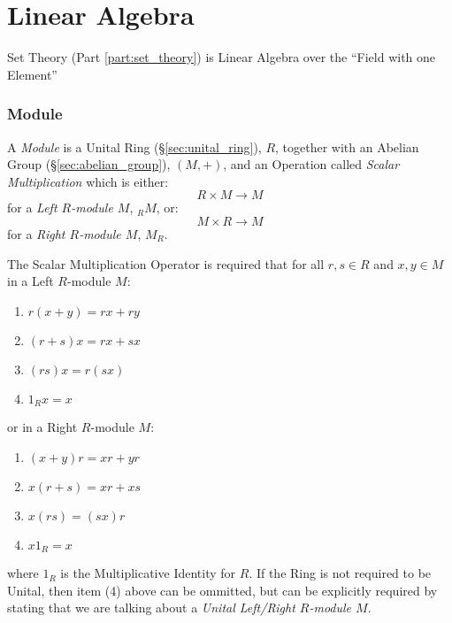 \part{Linear Algebra}\label{part:linear_algebra}

Set Theory (Part \ref{part:set_theory}) is Linear Algebra over the
``Field with one Element''



\section{Module}\label{sec:module}

A \emph{Module} is a Unital Ring (\S\ref{sec:unital_ring}), $R$,
together with an Abelian Group (\S\ref{sec:abelian_group}), $(M, +)$,
and an Operation called \emph{Scalar Multiplication} which is either:
\[ R \times M \rightarrow M \]
for a \emph{Left $R$-module $M$}, $_R M$, or:
\[ M \times R \rightarrow M \]
for a \emph{Right $R$-module $M$}, $M_R$.

The Scalar Multiplication Operator is required that for all $r,s \in
R$ and $x,y \in M$ in a Left $R$-module $M$:
\begin{enumerate}
    \item $r(x + y) = rx + ry$
    \item $(r + s)x = rx + sx$
    \item $(rs)x = r(sx)$
    \item $1_Rx = x$
\end{enumerate}
or in a Right $R$-module $M$:
\begin{enumerate}
    \item $(x + y)r = xr + yr$
    \item $x(r + s) = xr + xs$
    \item $x(rs) = (sx)r$
    \item $x 1_R = x$
\end{enumerate}
where $1_R$ is the Multiplicative Identity for $R$. If the Ring is not
required to be Unital, then item (4) above can be ommitted, but can be
explicitly required by stating that we are talking about a
\emph{Unital Left/Right $R$-module $M$}.

